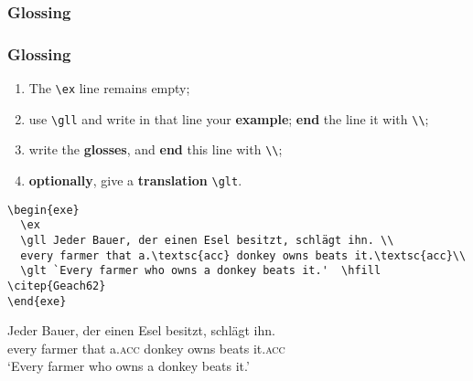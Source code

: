 \subsubsection{Glossing}
\begin{frame}[fragile]

\frametitle{Glossing}

\begin{enumerate}
	\item The \lstinline|\ex| line remains empty;
	
	\item use \lstinline|\gll| and write in that line your \textbf{example}; \textbf{end} the line it with \lstinline|\\|;
	
	\item write the \textbf{glosses}, and \textbf{end} this line with \lstinline|\\|;
	
	\item \textbf{optionally}, give a \textbf{translation} \lstinline|\glt|.
	
\end{enumerate}


\begin{lstlisting}
\begin{exe}
  \ex
  \gll Jeder Bauer, der einen Esel besitzt, schlägt ihn. \\
  every farmer that a.\textsc{acc} donkey owns beats it.\textsc{acc}\\
  \glt `Every farmer who owns a donkey beats it.'  \hfill \citep{Geach62}
\end{exe} 
\end{lstlisting}


\begin{exe}
	\ex
	\gll Jeder Bauer, der einen Esel besitzt, schlägt ihn. \\
	every farmer that a.\textsc{acc} donkey owns beats it.\textsc{acc}\\
	\glt `Every farmer who owns a donkey beats it.'  \hfill \citep{Geach62}
\end{exe} 

\end{frame}


